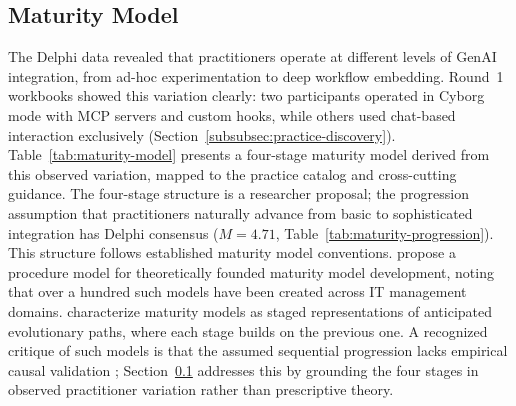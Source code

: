 \subsection{Maturity Model}\label{subsec:maturity-model}

The Delphi data revealed that practitioners operate at different levels of GenAI
integration, from ad-hoc experimentation to deep workflow embedding. Round~1
workbooks showed this variation clearly: two participants operated in Cyborg
mode with MCP servers and custom hooks, while others used chat-based interaction
exclusively (Section~\ref{subsubsec:practice-discovery}).
Table~\ref{tab:maturity-model} presents a four-stage maturity model derived from
this observed variation, mapped to the practice catalog and cross-cutting
guidance. The four-stage structure is a researcher proposal; the progression
assumption that practitioners naturally advance from basic to sophisticated
integration has Delphi consensus ($M = 4.71$,
Table~\ref{tab:maturity-progression}).
This structure follows established maturity model conventions.
\textcite{becker_developing_2009} propose a procedure model for
theoretically founded maturity model development, noting that over a
hundred such models have been created across IT management domains.
\textcite{poeppelbuss_what_2011} characterize maturity models as staged
representations of anticipated evolutionary paths, where each stage
builds on the previous one. A recognized critique of such models is
that the assumed sequential progression lacks empirical causal validation
\parencite{poeppelbuss_what_2011, van_steenbergen_maturity_2011};
Section~\ref{subsec:maturity-model} addresses this by grounding the
four stages in observed practitioner variation rather than prescriptive
theory.

